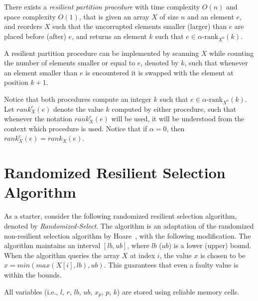 \documentclass{llncs}
\begin{document}
\begin{lemma}
\label{resilient_partition_algorithm}
There exists a \emph{resilient partition procedure} with time complexity $O(n)$ and space complexity $O(1)$, that is given an array $X$ of size $n$ and an element $e$, and reorders $X$ such that the uncorrupted elements smaller (larger) than $e$ are placed before (after) $e$, and returns an element $k$ such that $e \in \alpha\text{-rank}_{X^0}(k)$.
\end{lemma}

\begin{pf}
A resilient partition procedure can be implemented by scanning $X$ while counting the number of elements smaller or equal to $e$, denoted by $k$, such that whenever an element smaller than $e$ is encountered it is swapped with the element at position $k + 1$.
\end{pf}

Notice that both procedures compute an integer $k$ such that $e \in \alpha\text{-rank}_{X^0}(k)$. Let $rank^c_X(e)$ denote the value $k$ computed by either procedure, such that whenever the notation $rank^c_X(e)$ will be used, it will be understood from the context which procedure is used. Notice that if $\alpha = 0$, then $rank^c_X(e) = rank_X(e)$.

















\section{Randomized Resilient Selection Algorithm}
\label{sec:resilient_randomized_selection_algorithm}

As a starter, consider the following randomized resilient selection algorithm, denoted by \emph{Randomized-Select}. The algorithm is an adaptation of the randomized non-resilient selection algorithm by Hoare~\cite{hoare_selection}, with the following modification. The algorithm maintains an interval $[lb,ub]$, where $lb$ ($ub$) is a lower (upper) bound. When the algorithm queries the array $X$ at index $i$, the value $x$ is chosen to be $x = min(max(X[i], lb), ub)$. This guarantees that even a faulty value is within the bounds.

All variables (i.e., $l$, $r$, $lb$, $ub$, $x_p$, $p$, $k$) are stored using reliable memory cells.
\end{document}
